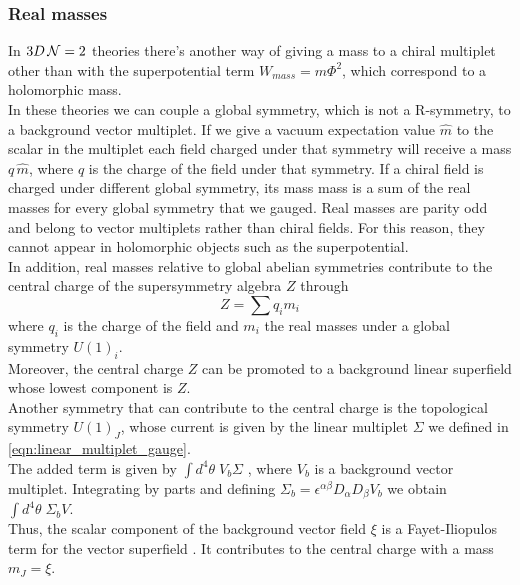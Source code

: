 \subsubsection{Real masses}

In $3 D \, \mathcal{N}=2$ theories there's another way of giving a mass to a chiral multiplet other than with the superpotential term $W_{mass}= m \Phi^2$, which correspond to a holomorphic mass.\\
In these theories we can couple a global symmetry, which is not a R-symmetry, to a background vector multiplet.
If we give a vacuum expectation value $\hat{m} $ to the scalar in the multiplet each field charged under that symmetry will receive a mass $q \, \hat{m}$, where $q$ is the charge of the field under that symmetry.
If a chiral field is charged under different global symmetry, its mass  mass is a sum of the real masses for every global symmetry that we gauged.
Real masses are parity odd and belong to vector multiplets rather than chiral fields. For this reason, they cannot appear in holomorphic objects such as the superpotential.\\
In addition, real masses relative to global abelian symmetries contribute to the central charge of the supersymmetry algebra $Z$ through
\begin{equation}
  Z = \sum q_i m_i
 \end{equation} 
 where $q_i$ is the charge of the field and $m_i$ the real masses under a global symmetry $U(1)_i$.\\
 Moreover, the central charge $Z$ can be promoted to a background linear superfield whose lowest component is $Z$.\\
 Another symmetry that can contribute to the central charge is the topological symmetry $U(1)_J$, whose current is given by the linear multiplet $\Sigma $ we defined in \eqref{eqn:linear_multiplet_gauge}.\\
 The added term is given by $\int d^4 \theta \; V_b \Sigma $ , where $V_b$ is a background vector multiplet.
 Integrating by parts and defining  $\Sigma_b = \epsilon^{\alpha \beta} D_{\alpha} D_{\beta} V_b$ we obtain $\int d^4 \theta \; \Sigma_b V  $.\\
 Thus, the scalar component of the background vector field $\xi$ is a Fayet-Iliopulos term for the vector superfield .
 It contributes to the central charge with a mass $ m_J = \xi $.


 













